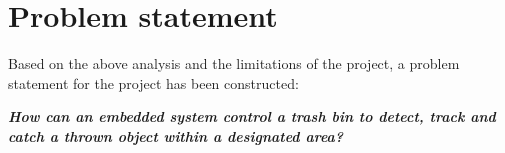 \section{Problem statement}
\label{sec:Problem statement}
Based on the above analysis and the limitations of the project, a problem statement for the project has been constructed:

\textbf{\textit{How can an embedded system control a trash bin to detect, track and catch a thrown object within a designated area?}}

